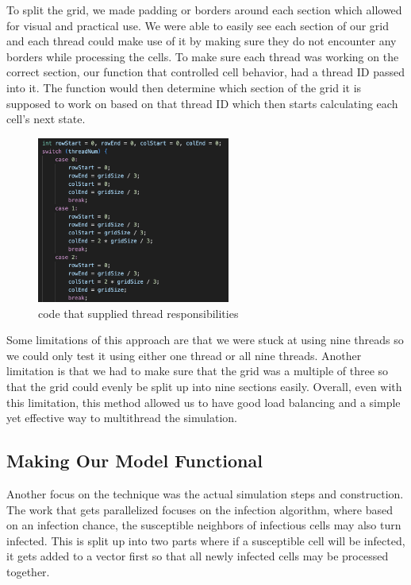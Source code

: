 \documentclass[conference]{IEEEtran}
\begin{document}
To split the grid, we made padding or borders around each section which allowed for visual and practical use. We were able to easily see each section of our grid and each thread could make use of it by making sure they do not encounter any borders while processing the cells. To make sure each thread was working on the correct section, our function that controlled cell behavior, had a thread ID passed into it. The function would then determine which section of the grid it is supposed to work on based on that thread ID which then starts calculating each cell’s next state.

\begin{figure}[!hbt]
\centering
\includegraphics[width=2.5in]{Figures/multithreading divisions.png}
\caption{code that supplied thread responsibilities}
\label{fig_sim}
\end{figure}

Some limitations of this approach are that we were stuck at using nine threads so we could only test it using either one thread or all nine threads. Another limitation is that we had to make sure that the grid was a multiple of three so that the grid could evenly be split up into nine sections easily. Overall, even with this limitation, this method allowed us to have good load balancing and a simple yet effective way to multithread the simulation.

\subsection{Making Our Model Functional}

Another focus on the technique was the actual simulation steps and construction. The work that gets parallelized focuses on the infection algorithm, where based on an infection chance, the susceptible neighbors of infectious cells may also turn infected. This is split up into two parts where if a susceptible cell will be infected, it gets added to a vector first so that all newly infected cells may be processed together.
\end{document}
